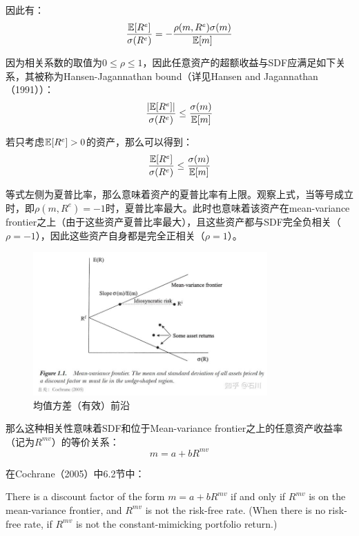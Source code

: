 \documentclass[11pt]{article}
\begin{document}
因此有：
\begin{equation*}
    \frac{\mathbb{E}[R^e]}{\sigma(R^e)} = -\frac{\rho(m,R^e)\sigma(m)}{\mathbb{E}[m]}
\end{equation*}

因为相关系数的取值为$0 \leq \rho \leq 1$，因此任意资产的超额收益与SDF应满足如下关系，其被称为Hansen-Jagannathan bound（详见Hansen and Jagannathan（1991））：
\begin{equation*}
    \frac{\left\lvert \mathbb{E}[R^e]\right\rvert}{\sigma(R^e)} \leq \frac{\sigma(m)}{\mathbb{E}[m]}
\end{equation*}

若只考虑$\mathbb{E}[R^e]>0$的资产，那么可以得到：
\begin{equation*}
    \frac{\mathbb{E}[R^e]}{\sigma(R^e)} \leq \frac{\sigma(m)}{\mathbb{E}[m]}
\end{equation*}

等式左侧为夏普比率，那么意味着资产的夏普比率有上限。观察上式，当等号成立时，即$\rho(m,R^e)=-1$时，夏普比率最大。此时也意味着该资产在mean-variance frontier之上（由于这些资产夏普比率最大），且这些资产都与SDF完全负相关（$\rho=-1$），因此这些资产自身都是完全正相关（$\rho=1$）。

\begin{figure}[H]
    \centering
    \includegraphics[width=0.8\textwidth]{fig/mean-variance-frontier.jpg}
    \caption{均值方差（有效）前沿}
    \label{fig:mean-variance-frontier}
\end{figure}

那么这种相关性意味着SDF和位于Mean-variance frontier之上的任意资产收益率（记为$R^{mv}$）的等价关系：
\begin{equation*}
    m = a + bR^{mv}
\end{equation*}

在Cochrane（2005）中6.2节中：
\begin{thm}
    There is a discount factor of the form $m = a + bR^{mv}$ if and only if $R^{mv}$ is on the mean-variance frontier, and $R^{mv}$ is not the risk-free rate. (When there is no risk-free rate, if $R^{mv}$ is not the constant-mimicking portfolio return.)
\end{thm}
\end{document}
